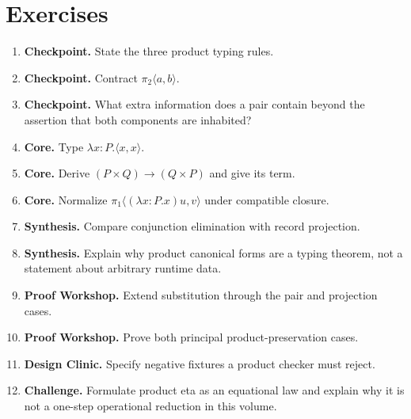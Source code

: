 \section*{Exercises}
\begin{enumerate}[label=\textbf{3.\arabic*.}]
\item \textbf{Checkpoint.} State the three product typing rules.
\item \textbf{Checkpoint.} Contract $\pi_2\langle a,b\rangle$.
\item \textbf{Checkpoint.} What extra information does a pair contain beyond the assertion that both components are inhabited?
\item \textbf{Core.} Type $\lambda x{:}P.\langle x,x\rangle$.
\item \textbf{Core.} Derive $(P\times Q)\to(Q\times P)$ and give its term.
\item \textbf{Core.} Normalize $\pi_1\langle(\lambda x{:}P.x)u,v\rangle$ under compatible closure.
\item \textbf{Synthesis.} Compare conjunction elimination with record projection.
\item \textbf{Synthesis.} Explain why product canonical forms are a typing theorem, not a statement about arbitrary runtime data.
\item \textbf{Proof Workshop.} Extend substitution through the pair and projection cases.
\item \textbf{Proof Workshop.} Prove both principal product-preservation cases.
\item \textbf{Design Clinic.} Specify negative fixtures a product checker must reject.
\item \textbf{Challenge.} Formulate product eta as an equational law and explain why it is not a one-step operational reduction in this volume.
\end{enumerate}
